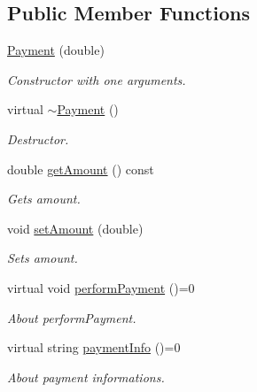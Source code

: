 \subsection*{Public Member Functions}
\begin{DoxyCompactItemize}
\item 
\hyperlink{classPayment_abe05f968db46b0211379eeee357ef58d}{Payment} (double)
\begin{DoxyCompactList}\small\item\em Constructor with one arguments. \end{DoxyCompactList}\item 
\mbox{\label{classPayment_acc52d8f5b5b333f8acd89611f4926082}} 
virtual \hyperlink{classPayment_acc52d8f5b5b333f8acd89611f4926082}{$\sim$\+Payment} ()
\begin{DoxyCompactList}\small\item\em Destructor. \end{DoxyCompactList}\item 
double \hyperlink{classPayment_a589cf7d06f7365d5505948bdef033828}{get\+Amount} () const
\begin{DoxyCompactList}\small\item\em Gets amount. \end{DoxyCompactList}\item 
void \hyperlink{classPayment_ae967c922e523959e20933da449e5d0fd}{set\+Amount} (double)
\begin{DoxyCompactList}\small\item\em Sets amount. \end{DoxyCompactList}\item 
\mbox{\label{classPayment_afc011ab4bc8dee83b184bdc056d4c2a9}} 
virtual void \hyperlink{classPayment_afc011ab4bc8dee83b184bdc056d4c2a9}{perform\+Payment} ()=0
\begin{DoxyCompactList}\small\item\em About perform\+Payment. \end{DoxyCompactList}\item 
\mbox{\label{classPayment_ae3be1f239771fbe95b173a82e4b49543}} 
virtual string \hyperlink{classPayment_ae3be1f239771fbe95b173a82e4b49543}{payment\+Info} ()=0
\begin{DoxyCompactList}\small\item\em About payment informations. \end{DoxyCompactList}\end{DoxyCompactItemize}


